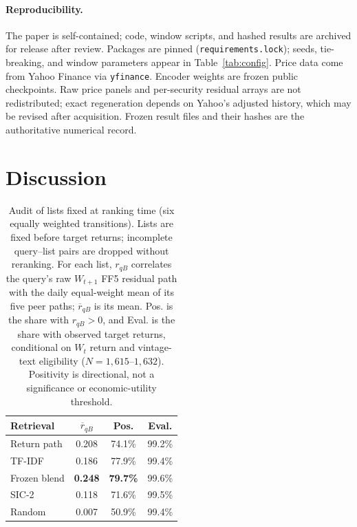 \documentclass[sigconf,anonymous]{acmart}
\begin{document}
\paragraph{Reproducibility.}
The paper is self-contained; code, window scripts, and hashed results are
archived for release after review.  Packages are pinned
(\texttt{requirements.lock}); seeds, tie-breaking, and window parameters appear
in Table~\ref{tab:config}.
Price data come from Yahoo Finance via \texttt{yfinance}.  Encoder weights are frozen public
checkpoints.  Raw price panels and per-security residual arrays are not
redistributed; exact regeneration depends on Yahoo's adjusted history, which
may be revised after acquisition.  Frozen result files and their hashes are the
authoritative numerical record.

\section{Discussion}
\label{sec:discussion}

\begin{table}[t]
\caption{Audit of lists fixed at ranking time (six equally weighted
transitions).  Lists are fixed before target returns; incomplete query--list
pairs are dropped without reranking.  For each list, $r_{qB}$ correlates the query's raw
$W_{t+1}$ FF5 residual path with the daily equal-weight mean of its five peer
paths; $\overline r_{qB}$ is its mean.  Pos.
is the share with $r_{qB}>0$, and Eval. is the share with observed target
returns, conditional on $W_t$ return and vintage-text eligibility
($N=1{,}615$--$1{,}632$).  Positivity is directional, not a
significance or economic-utility threshold.}
\label{tab:application}
\small\setlength{\tabcolsep}{4pt}
\begin{tabular}{lccc}
\toprule
\textbf{Retrieval} & $\overline r_{qB}$ & \textbf{Pos.} & \textbf{Eval.} \\
\midrule
Return path & 0.208 & 74.1\% & 99.2\% \\
TF-IDF & 0.186 & 77.9\% & 99.4\% \\
Frozen blend & \textbf{0.248} & \textbf{79.7\%} & 99.6\% \\
SIC-2 & 0.118 & 71.6\% & 99.5\% \\
Random & 0.007 & 50.9\% & 99.4\% \\
\bottomrule
\end{tabular}
\end{table}
\end{document}
